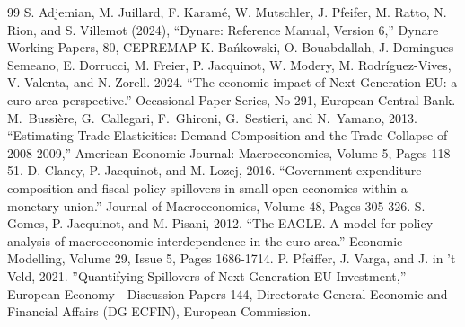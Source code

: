 \documentclass[paper=letter, fontsize=12pt]{article}
\begin{document}
\begin{thebibliography}{99}
S. Adjemian, M. Juillard, F. Karamé, W. Mutschler, J. Pfeifer, M. Ratto, N. Rion,  and S. Villemot (2024), ``Dynare: Reference Manual, Version 6,'' Dynare Working Papers, 80, CEPREMAP
K. Bańkowski, O. Bouabdallah, J. Domingues Semeano, E. Dorrucci,
M. Freier, P. Jacquinot, W. Modery, M. Rodríguez-Vives, V. Valenta, and N. Zorell. 2024. ``The economic impact of Next Generation EU: a euro area perspective.'' Occasional Paper Series, No 291, European Central Bank.
M.~Bussière, G.~Callegari, F.~Ghironi, G.~Sestieri, and N.~Yamano, 2013. ``Estimating Trade Elasticities: Demand Composition and the Trade Collapse of 2008-2009,'' American Economic Journal: Macroeconomics, Volume 5, Pages 118-51.
D. Clancy, P. Jacquinot, and M. Lozej, 2016. ``Government expenditure composition and fiscal policy spillovers in small open economies within a monetary union.'' Journal of Macroeconomics, Volume 48, Pages 305-326.
S. Gomes, P. Jacquinot, and M. Pisani, 2012. ``The EAGLE. A model for policy analysis of macroeconomic interdependence in the euro area.'' Economic Modelling, Volume 29, Issue 5, Pages 1686-1714.
P. Pfeiffer, J. Varga, and J. in 't Veld, 2021. ''Quantifying Spillovers of Next Generation EU Investment,'' European Economy - Discussion Papers 144, Directorate General Economic and Financial Affairs (DG ECFIN), European Commission.

\end{thebibliography}


\end{document}
